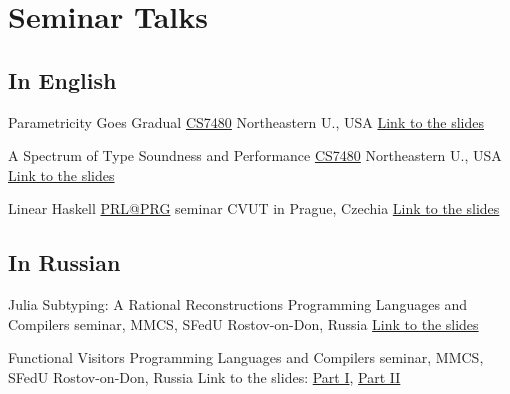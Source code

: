 \documentclass[11pt,a4paper]{moderncv}   %
\newcommand{\myhref}[2]{\textcolor{blue}{\href{#1}{#2}}}
\begin{document}
\section{Seminar Talks}
{\footnotesize
  \subsection{In English}
  

          {Parametricity Goes Gradual}
          {\myhref{http://www.ccs.neu.edu/home/amal/course/7480-s19/}{CS7480}}
          {Northeastern U., USA}
          {}
          {\myhref{http://staff.mmcs.sfedu.ru/~ulysses/Talks/2019-cs7480-gradual-parametricity.pdf}{Link to the slides}}
  
          {A Spectrum of Type Soundness and Performance}
          {\myhref{http://www.ccs.neu.edu/home/amal/course/7480-s19/}{CS7480}}
          {Northeastern U., USA}
          {}
          {\myhref{http://staff.mmcs.sfedu.ru/~ulysses/Talks/2019-cs7480-gradual-spectrum.pdf}{Link to the slides}}

          {Linear Haskell}
          {\myhref{https://prl-prg.github.io/}{PRL@PRG} seminar}
          {CVUT in Prague, Czechia}
          {}
          {\myhref{http://staff.mmcs.sfedu.ru/~ulysses/Talks/2018-linear-haskell/}{Link to the slides}}

          
\subsection{In Russian}

%
    {Julia Subtyping: A Rational Reconstructions}
    {Programming Languages and Compilers seminar, MMCS, SFedU}
    {Rostov-on-Don, Russia}%
    {}%
    {\myhref{http://staff.mmcs.sfedu.ru/~ulysses/Talks/2018-lj-plc/}{Link to the slides}}

    
            {Functional Visitors}
            {Programming Languages and Compilers seminar, MMCS, SFedU}
            {Rostov-on-Don, Russia}
            {}
            {Link to the slides: \myhref{http://forum.mmcs.sfedu.ru/uploads/default/original/1X/87bd89c2abeef38c7ff835cecd2485c24b1e78c8.pdf}{Part I}, \myhref{http://forum.mmcs.sfedu.ru/uploads/default/original/1X/5fee3e64f4528aaf68fc4665b21ed3173a97497d.pdf}{Part II}}

}
\end{document}
